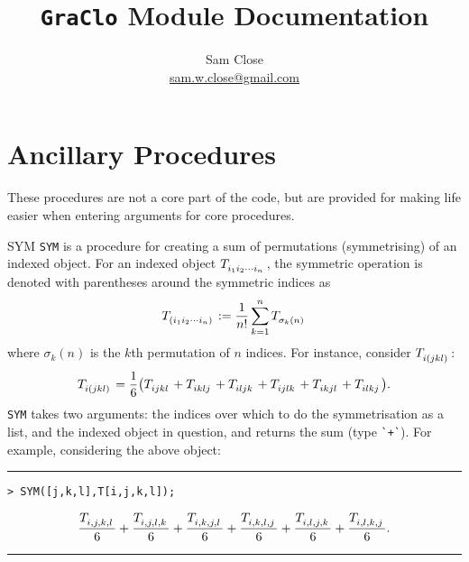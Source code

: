 \documentclass{article}
\title{\verb~GraClo~ Module Documentation}
\author{Sam Close \\ \href{mailto:sam.w.close@gmail.com}{sam.w.close@gmail.com}}
\begin{document}
\maketitle
\tableofcontents

\section{Ancillary Procedures}
These procedures are not a core part of the code, but are provided for making life easier when entering arguments for core procedures.
\begin{macro}{SYM} 
\verb~SYM~ is a procedure for creating a sum of permutations (symmetrising) of an indexed object. For an indexed object $\tensor{T}{_{i_1}_{i_2}_\cdots_{i_n}}$, the symmetric operation is denoted with parentheses around the symmetric indices as
\[
\tensor{T}{_{(}_{i_1}_{i_2}_\cdots_{i_n}_{)}}: = \frac{1}{n!} \sum_{k=1}^n \tensor{T}{_{\sigma_k (n)}}
\]
where $\sigma_k(n)$ is the $k$th permutation of $n$ indices. For instance, consider $\tensor{T}{_i_{(}_j_k_l_{)}}$:
\[
\tensor{T}{_i_{(}_j_k_l_{)}} = \frac{1}{6} \pqty{ \tensor{T}{_i_j_k_l} + \tensor{T}{_i_k_l_j} + \tensor{T}{_i_l_j_k} + \tensor{T}{_i_j_l_k} + \tensor{T}{_i_k_j_l} + \tensor{T}{_i_l_k_j}}.
\]
\verb~SYM~ takes two arguments: the indices over which to do the symmetrisation as a list, and the indexed object in question, and returns the sum (type \verb~`+`~). For example, considering the above object:
\newline\rule{1.0\linewidth}{0.4pt}
\begin{verbatim}
> SYM([j,k,l],T[i,j,k,l]);
\end{verbatim}
\[
{ \frac{\tensor{T}{_{i,}_{j,}_{k,}_l}}{6} + \frac{\tensor{T}{_{i,}_{j,}_{l,}_k}}{6} + \frac{\tensor{T}{_{i,}_{k,}_{j,}_l}}{6} + \frac{\tensor{T}{_{i,}_{k,}_{l,}_j}}{6} + \frac{\tensor{T}{_{i,}_{l,}_{j,}_k}}{6} + \frac{\tensor{T}{_{i,}_{l,}_{k,}_j}}{6}}.
\]
\newline\rule{1.0\linewidth}{0.4pt}
\end{macro}
\end{document}
